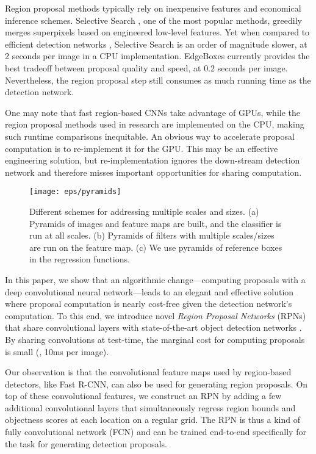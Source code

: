 \documentclass[10pt,journal,cspaper,compsoc]{IEEEtran}
\begin{document}
Region proposal methods typically rely on inexpensive features and economical inference schemes.
Selective Search \cite{Uijlings2013}, one of the most popular methods, greedily merges superpixels based on engineered low-level features. Yet when compared to efficient detection networks \cite{Girshick2015a}, Selective Search is an order of magnitude slower, at 2 seconds per image in a CPU implementation.
EdgeBoxes \cite{Zitnick2014} currently provides the best tradeoff between proposal quality and speed, at 0.2 seconds per image. Nevertheless, the region proposal step still consumes as much running time as the detection network.

One may note that fast region-based CNNs take advantage of GPUs, while the region proposal methods used in research are implemented on the CPU, making such runtime comparisons inequitable. An obvious way to accelerate proposal computation is to re-implement it for the GPU. This may be an effective engineering solution, but re-implementation ignores the down-stream detection network and therefore misses important opportunities for sharing computation.

\begin{figure*}[t]
\centering
\texttt{[image: eps/pyramids]}
\caption{Different schemes for addressing multiple scales and sizes. (a) Pyramids of images and feature maps are built, and the classifier is run at all scales. (b) Pyramids of filters with multiple scales/sizes are run on the feature map. (c) We use pyramids of reference boxes in the regression functions.}
\label{fig:pyramids}
\end{figure*}

In this paper, we show that an algorithmic change---computing proposals with a deep convolutional neural network---leads to an elegant and effective solution where proposal computation is nearly cost-free given the detection network's computation.
To this end, we introduce novel \emph{Region Proposal Networks} (RPNs) that share convolutional layers with state-of-the-art object detection networks \cite{He2014,Girshick2015a}. By sharing convolutions at test-time, the marginal cost for computing proposals is small (\eg, 10ms per image).

Our observation is that the convolutional feature maps used by region-based detectors, like Fast R-CNN, can also be used for generating region proposals.
On top of these convolutional features, we construct an RPN by adding a few additional convolutional layers that simultaneously regress region bounds and objectness scores at each location on a regular grid.
The RPN is thus a kind of fully convolutional network (FCN) \cite{Long2015} and can be trained end-to-end specifically for the task for generating detection proposals.
\end{document}
